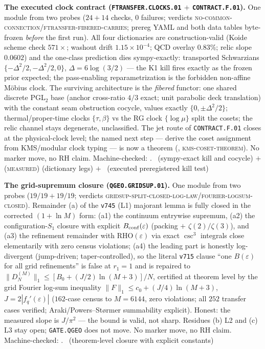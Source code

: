 \par\smallskip\noindent\textbf{The executed clock contract
(\texttt{FTRANSFER.CLOCKS.01} $+$ \texttt{CONTRACT.F.01}).}
One module from two probes ($24+14$ checks, $0$ failures; verdicts
\textsc{no-common-connection}/\textsc{ftransfer-fibered-carries};
prereg YAML and both data tables byte-frozen \emph{before} the
first run).  All four dictionaries are construction-valid (Koide
scheme check $571\times$; washout drift $1.15\times10^{-4}$; QCD
overlay $0.83\%$; relic slope $0.0602$) and the one-class
prediction dies sympy-exactly: transported Schwarzians
$\{-\Delta^2/2,-\Delta^2/2,0\}$, $\Delta=6\log(3/2)$ --- the K1
kill fires exactly as the frozen prior expected; the pass-enabling
reparametrization is the forbidden non-affine M\"obius clock.  The
surviving architecture is the \emph{fibered} functor: one shared
discrete PGL$_2$ base (anchor cross-ratio $4/3$ exact; unit
parabolic deck translation) with the constant seam obstruction
cocycle, values exactly $\{0,\pm\Delta^2/2\}$; thermal/proper-time
clocks $\{\tau,\beta\}$ vs the RG clock $\{\log\mu\}$ split the
cosets; the relic channel stays degenerate, unclassified.  The jet
route of \texttt{CONTRACT.F.01} closes at the physical-clock
level; the named next step --- derive the coset assignment from
KMS/modular clock typing --- is now a theorem
(,
\textsc{kms-coset-theorem}).  No marker move, no RH claim.
Machine-checked: .
\mE\ (sympy-exact kill and cocycle) $+$ (\textsc{measured})
(dictionary legs) $+$ \mX\ (executed preregistered kill test)
\par\smallskip

\par\smallskip\noindent\textbf{The grid-supremum closure
(\texttt{QGEO.GRIDSUP.01}).}
One module from two probes ($19/19+19/19$; verdicts
\textsc{gridsup-split-closed-log-law}/\textsc{fourier-logsum-closed}).
Remainder (a) of the \texttt{v745} (L1) majorant lemma is fully
closed in the corrected $(1+\ln M)$ form: (a1) the continuum
entrywise supremum, (a2) the configuration-$S_1$ closure with
explicit $B_{\rm conf}(\varepsilon)$ (packing $+$
$\zeta(2)/\zeta(3)$), and (a3) the refinement remainder with
$\mathrm{RHO}(\varepsilon)$ via exact $\csc^3$ integrals close
elementarily with zero census violations; (a4) the leading part is
honestly log-divergent (jump-driven; taper-controlled), so the
literal \texttt{v715} clause ``one $B(\varepsilon)$ for all grid
refinements'' is false at $r_1=1$ and is repaired to
$\|D_N^{(M)}\|_1\le[B_0+(J/2)\ln(M{+}3)]/N$, certified at theorem
level by the grid Fourier log-sum inequality
$\|F\|_1\le c_0+(J/4)\ln(M{+}3)$, $J=2|f_q'(\varepsilon)|$
($162$-case census to $M=6144$, zero violations; all $252$
transfer cases verified; Araki/Powers--St\o rmer summability
explicit).  Honest: the measured slope is $J/\pi^2$ --- the bound
is valid, not sharp.  Residues (b) L2 and (c) L3 stay open;
\texttt{GATE.QGEO} does not move.  No marker move, no RH claim.
Machine-checked: .
\mE\ (theorem-level closure with explicit constants)
\par\smallskip

